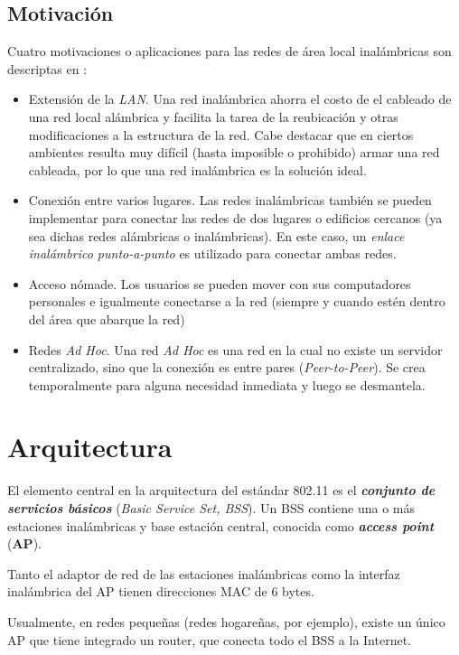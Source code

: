 \subsection{Motivación}

Cuatro motivaciones o aplicaciones para las redes de área local inalámbricas son descriptas en \autocite{Stallings:Wireless}:

\begin{itemize}
    \item Extensión de la \emph{LAN}. Una red inalámbrica ahorra el costo de el cableado de una red local alámbrica y facilita la tarea de la reubicación y otras modificaciones a la estructura de la red. Cabe destacar que en ciertos ambientes resulta muy difícil (hasta imposible o prohibido) armar una red cableada, por lo que una red inalámbrica es la solución ideal.
    \item Conexión entre varios lugares. Las redes inalámbricas también se pueden implementar para conectar las redes de dos lugares o edificios cercanos (ya sea dichas redes alámbricas o inalámbricas). En este caso, un \emph{enlace inalámbrico punto-a-punto} es utilizado para conectar ambas redes. 
    \item Acceso nómade. Los usuarios se pueden mover con sus computadores personales e igualmente conectarse a la red (siempre y cuando estén dentro del área que abarque la red)
    \item Redes \emph{Ad Hoc}. Una red \emph{Ad Hoc} es una red en la cual no existe un servidor centralizado, sino que la conexión es entre pares (\emph{Peer-to-Peer}). Se crea temporalmente para alguna necesidad inmediata y luego se desmantela. 
\end{itemize}


\section{Arquitectura}

El elemento central en la arquitectura del estándar 802.11 es el \emph{\textbf{conjunto de servicios básicos}} (\emph{Basic Service Set, BSS}). Un BSS contiene una o más estaciones inalámbricas y base estación central, conocida como \emph{\textbf{access point}} (\textbf{AP}).

Tanto el adaptor de red de las estaciones inalámbricas como la interfaz inalámbrica del AP tienen direcciones MAC de 6 bytes.

Usualmente, en redes pequeñas (redes hogareñas, por ejemplo), existe un único AP que tiene integrado un router, que conecta todo el BSS a la Internet.

